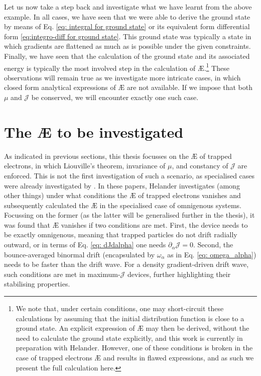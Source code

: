Let us now take a step back and investigate what we have learnt from the above example. In all cases, we have seen that we were able to derive the ground state by means of Eq. \eqref{eq: integral for ground state} or its equivalent form differential form \eqref{eq:integro-diff for ground state}.  This ground state was typically a state in which gradients are flattened as much as is possible under the given constraints. Finally, we have seen that the calculation of the ground state and its associated energy is typically the most involved step in the calculation of \AE{}.\footnote{We note that, under certain conditions, one may short-circuit these calculations by assuming that the initial distribution function is close to a ground state. An explicit expression of \AE{} may then be derived, without the need to calculate the ground state explicitly, and this work is currently in preparation with Helander. However, one of these conditions is broken in the case of trapped electrons \AE{} and results in flawed expressions, and as such we present the full calculation here.} These observations will remain true as we investigate more intricate cases, in which closed form analytical expressions of \AE{} are not available. If we impose that both $\mu$ and $\mathcal{J}$ be conserved, we will encounter exactly one such case.

\section{The \AE{} to be investigated}
As indicated in previous sections, this thesis focusses on the \AE{} of trapped electrons, in which Liouville's theorem, invariance of $\mu$, and constancy of $\mathcal{J}$ are enforced. This is not the first investigation of such a scenario, as specialised cases were already investigated by \citet{helander2017available,helander2020available}. In these papers, Helander investigates (among other things) under what conditions the \AE{} of trapped electrons vanishes and subsequently calculated the \AE{} in the specialised case of omnigenous systems. Focussing on the former (as the latter will be generalised further in the thesis), it was found that \AE{} vanishes if two conditions are met. First, the device needs to be exactly omnigenous, meaning that trapped particles do not drift radially outward, or in terms of Eq. \eqref{eq: dJdalpha} one needs $\partial_\alpha \mathcal{J} = 0$. Second, the bounce-averaged binormal drift (encapsulated by $\omega_\alpha$ as in Eq. \eqref{eq: omega_alpha}) needs to be faster than the drift wave. For a density gradient-driven drift wave, such conditions are met in maximum-$\mathcal{J}$ devices, further highlighting their stabilising properties. \par 

